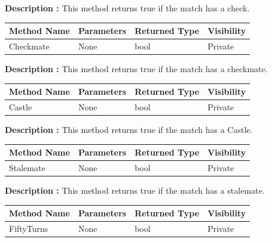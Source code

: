 \documentclass[12pt]{article}
\begin{document}
\textbf{Description :} This method returns true if the match has a check.

\begin{table}[H]
    \begin{tabular}{|l|l|l|l|}
    \hline
    \rowcolor[HTML]{EFEFEF} 
    \cellcolor[HTML]{EFEFEF}\textbf{Method Name} & \textbf{Parameters}    & \textbf{Returned Type} & \textbf{Visibility} \\ \hline
    Checkmate                                    & None                   & bool                   & Private              \\ \hline
    \end{tabular}
\end{table}

\textbf{Description :} This method returns true if the match has a checkmate.

\begin{table}[H]
    \begin{tabular}{|l|l|l|l|}
    \hline
    \rowcolor[HTML]{EFEFEF} 
    \cellcolor[HTML]{EFEFEF}\textbf{Method Name} & \textbf{Parameters}    & \textbf{Returned Type} & \textbf{Visibility} \\ \hline
    Castle                                       & None                   & bool                   & Private              \\ \hline
    \end{tabular}
\end{table}

\textbf{Description :} This method returns true if the match has a Castle.

\begin{table}[H]
    \begin{tabular}{|l|l|l|l|}
    \hline
    \rowcolor[HTML]{EFEFEF} 
    \cellcolor[HTML]{EFEFEF}\textbf{Method Name} & \textbf{Parameters}    & \textbf{Returned Type} & \textbf{Visibility} \\ \hline
    Stalemate                                    & None                   & bool                   & Private              \\ \hline
    \end{tabular}
\end{table}

\textbf{Description :} This method returns true if the match has a stalemate.

\begin{table}[H]
    \begin{tabular}{|l|l|l|l|}
    \hline
    \rowcolor[HTML]{EFEFEF} 
    \cellcolor[HTML]{EFEFEF}\textbf{Method Name} & \textbf{Parameters}    & \textbf{Returned Type} & \textbf{Visibility} \\ \hline
    FiftyTurns                                   & None                   & bool                   & Private              \\ \hline
    \end{tabular}
\end{table}
\end{document}
